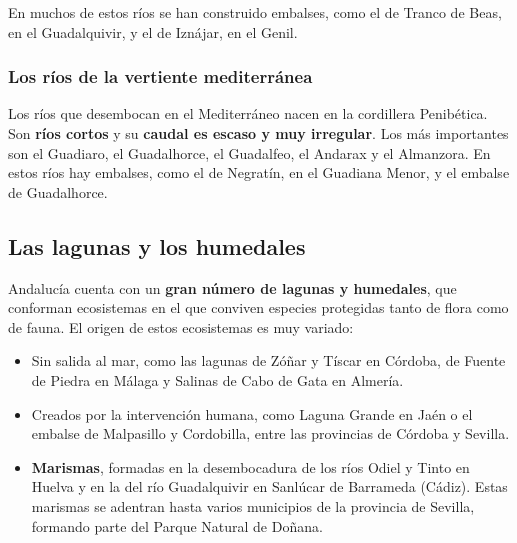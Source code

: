 En muchos de estos ríos se han construido embalses, como el de Tranco de Beas, en el Guadalquivir, y el de Iznájar, en el Genil.

\subsubsection{Los ríos de la vertiente mediterránea}

Los ríos que desembocan en el Mediterráneo nacen en la cordillera Penibética. Son \textbf{ríos cortos} y su \textbf{caudal es escaso y muy irregular}. Los más importantes son el Guadiaro, el Guadalhorce, el Guadalfeo, el Andarax y el Almanzora. En estos ríos hay embalses, como el de Negratín, en el Guadiana Menor, y el embalse de Guadalhorce.

\subsection{Las lagunas y los humedales}

Andalucía cuenta con un \textbf{gran número de lagunas y humedales}, que conforman ecosistemas en el que conviven especies protegidas tanto de flora como de fauna. El origen de estos ecosistemas es muy variado:

\begin{itemize}
    \item Sin salida al mar, como las lagunas de Zóñar y Tíscar en Córdoba, de Fuente de Piedra en Málaga y Salinas de Cabo de Gata en Almería.
    \item Creados por la intervención humana, como Laguna Grande en Jaén o el embalse de Malpasillo y Cordobilla, entre las provincias de Córdoba y Sevilla.
    \item \textbf{Marismas}, formadas en la desembocadura de los ríos Odiel y Tinto en Huelva y en la del río Guadalquivir en Sanlúcar de Barrameda (Cádiz). Estas marismas se adentran hasta varios municipios de la provincia de Sevilla, formando parte del Parque Natural de Doñana.
\end{itemize}